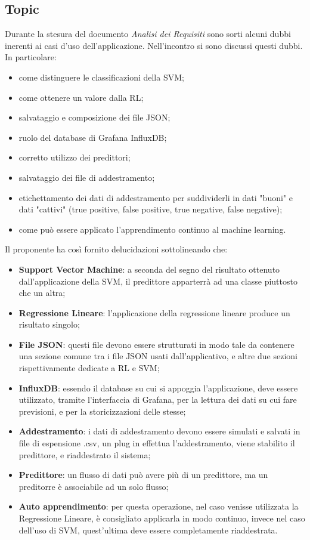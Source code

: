 \subsection{Topic}
Durante la stesura del documento \textit{Analisi dei Requisiti} sono sorti alcuni dubbi inerenti ai casi d'uso dell'applicazione. Nell'incontro si sono discussi questi dubbi.\\
In particolare:
\begin{itemize}
	\item come distinguere le classificazioni della SVM;
	\item come ottenere un valore dalla RL;
	\item salvataggio e composizione dei file JSON;
	\item ruolo del database di Grafana InfluxDB;
	\item corretto utilizzo dei predittori;
	\item salvataggio dei file di addestramento;
	\item etichettamento dei dati di addestramento per suddividerli in dati "buoni" e dati "cattivi" (true positive, false positive, true negative, false negative);
	\item come può essere applicato l'apprendimento continuo al machine learning.
\end{itemize}
Il proponente ha così fornito delucidazioni sottolineando che:
\begin{itemize}
\item \textbf{Support Vector Machine}: a seconda del segno del risultato ottenuto dall'applicazione della SVM, il predittore apparterrà ad una classe piuttosto che un altra;
\item \textbf{Regressione Lineare}: l'applicazione della regressione lineare produce un risultato singolo;
\item \textbf{File JSON}: questi file devono essere strutturati in modo tale da contenere una sezione comune tra i file JSON usati dall'applicativo, e altre due sezioni rispettivamente dedicate a RL e SVM;
\item \textbf{InfluxDB}: essendo il database su cui si appoggia l'applicazione, deve essere utilizzato, tramite l'interfaccia di Grafana, per la lettura dei dati su cui fare previsioni, e per la storicizzazioni delle stesse;
\item \textbf{Addestramento}: i dati di addestramento devono essere simulati e salvati in file di espensione .csv\glo , un plug in effettua l'addestramento, viene stabilito il predittore, e riaddestrato il sistema;
\item \textbf{Predittore}: un flusso di dati può avere più di un predittore, ma un preditorre è associabile ad un solo flusso;
\item \textbf{Auto apprendimento}: per questa operazione, nel caso venisse utilizzata la Regressione Lineare, è consigliato applicarla in modo continuo, invece nel caso dell'uso di SVM, quest'ultima deve essere completamente riaddestrata.
\end{itemize}